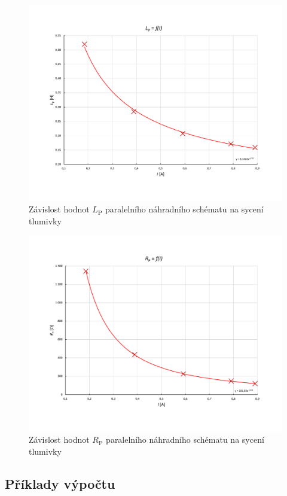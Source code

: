 \documentclass[a4paper, czech]{article}
\begin{document}
\begin{figure}[H]
    \centering
    \includegraphics[width=\textwidth, trim={0 3cm 0 3cm}]{grafy/9A_graf2.pdf}
    \caption{Závislost hodnot $L_\text{P}$ paralelního náhradního schématu na sycení tlumivky}
\end{figure}

\begin{figure}[H]
    \centering
    \includegraphics[width=\textwidth, trim={0 3cm 0 3cm}]{grafy/9A_graf1.pdf}
    \caption{Závislost hodnot $R_\text{P}$ paralelního náhradního schématu na sycení tlumivky}
\end{figure}

\subsection{Příklady výpočtu}
\end{document}

